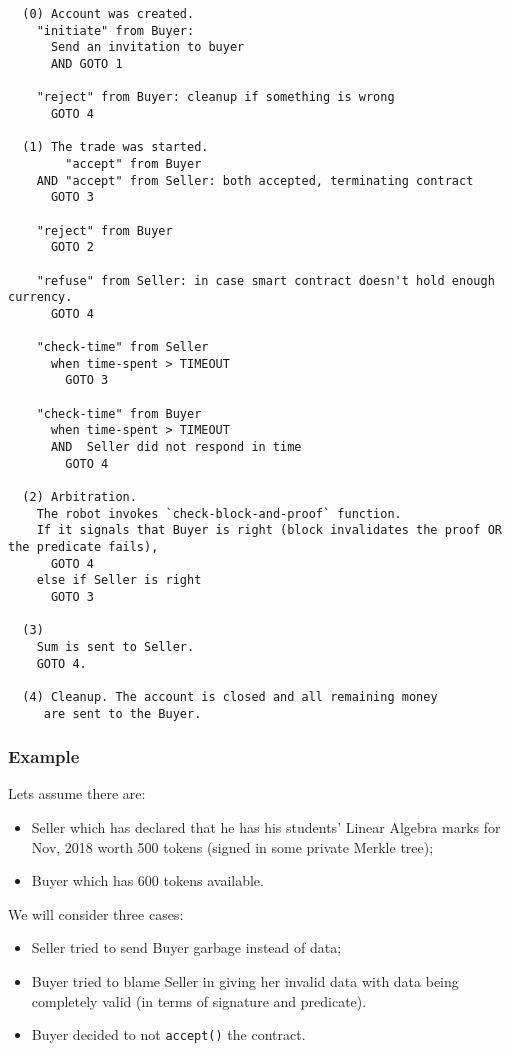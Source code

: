 \begin{verbatim}
  (0) Account was created.
    "initiate" from Buyer:
      Send an invitation to buyer
      AND GOTO 1

    "reject" from Buyer: cleanup if something is wrong
      GOTO 4

  (1) The trade was started.
        "accept" from Buyer
    AND "accept" from Seller: both accepted, terminating contract
      GOTO 3

    "reject" from Buyer
      GOTO 2

    "refuse" from Seller: in case smart contract doesn't hold enough currency.
      GOTO 4

    "check-time" from Seller
      when time-spent > TIMEOUT
        GOTO 3

    "check-time" from Buyer
      when time-spent > TIMEOUT
      AND  Seller did not respond in time
        GOTO 4

  (2) Arbitration.
    The robot invokes `check-block-and-proof` function.
    If it signals that Buyer is right (block invalidates the proof OR the predicate fails),
      GOTO 4
    else if Seller is right
      GOTO 3

  (3)
    Sum is sent to Seller.
    GOTO 4.

  (4) Cleanup. The account is closed and all remaining money
     are sent to the Buyer.

\end{verbatim}

\subsubsection{Example}

Lets assume there are:
\begin{itemize}
  \item Seller which has declared that he has his students' Linear Algebra marks for Nov, 2018 worth 500 tokens (signed in some private Merkle tree);
  \item Buyer which has 600 tokens available.
\end{itemize}

We will consider three cases:
\begin{itemize}
  \item Seller tried to send Buyer garbage instead of data;
  \item Buyer tried to blame Seller in giving her invalid data with data being completely valid (in terms of signature and predicate).
  \item Buyer decided to not \verb|accept()| the contract.
\end{itemize}

